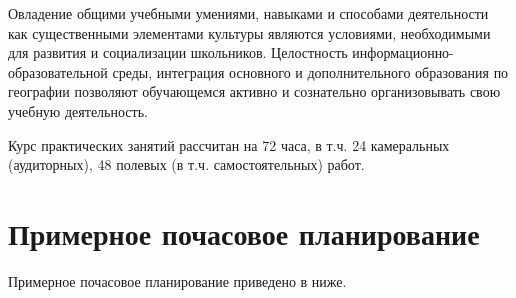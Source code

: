 \documentclass[
  11pt,
  russian,
]{book}
\begin{document}
Овладение общими учебными умениями, навыками и способами деятельности как существенными элементами культуры являются условиями, необходимыми для развития и социализации школьников. Целостность информационно-образовательной среды, интеграция основного и дополнительного образования по географии позволяют обучающемся активно и сознательно организовывать свою учебную деятельность.

Курс практических занятий рассчитан на 72 часа, в т.ч. 24 камеральных (аудиторных), 48 полевых (в т.ч. самостоятельных) работ.

\hypertarget{ux43fux440ux438ux43cux435ux440ux43dux43eux435-ux43fux43eux447ux430ux441ux43eux432ux43eux435-ux43fux43bux430ux43dux438ux440ux43eux432ux430ux43dux438ux435}{%
\section*{Примерное почасовое планирование}\label{ux43fux440ux438ux43cux435ux440ux43dux43eux435-ux43fux43eux447ux430ux441ux43eux432ux43eux435-ux43fux43bux430ux43dux438ux440ux43eux432ux430ux43dux438ux435}}

Примерное почасовое планирование приведено в ниже.
\end{document}
